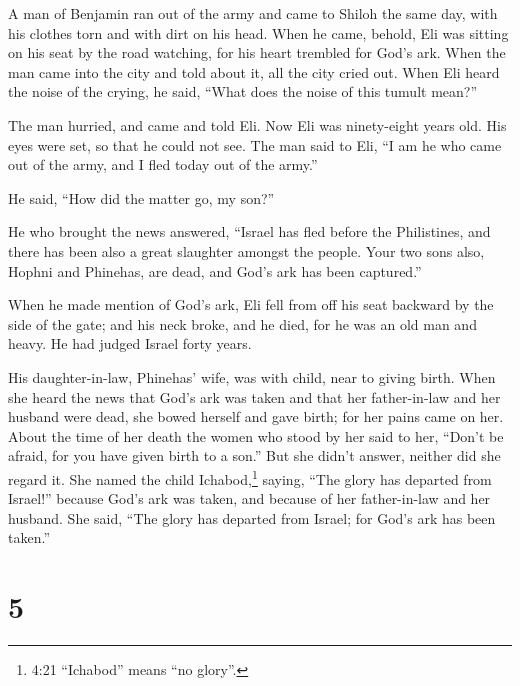  A man of Benjamin ran out of the army and came to Shiloh
the same day, with his clothes torn and with dirt on his head.
 When he came, behold, Eli was sitting on his seat by the
road watching, for his heart trembled for God's ark. When the man came
into the city and told about it, all the city cried out. 
When Eli heard the noise of the crying, he said, ``What does the noise
of this tumult mean?''

The man hurried, and came and told Eli.  Now Eli was
ninety-eight years old. His eyes were set, so that he could not see.
 The man said to Eli, ``I am he who came out of the army,
and I fled today out of the army.''

He said, ``How did the matter go, my son?''

 He who brought the news answered, ``Israel has fled before
the Philistines, and there has been also a great slaughter amongst the
people. Your two sons also, Hophni and Phinehas, are dead, and God's ark
has been captured.''

 When he made mention of God's ark, Eli fell from off his
seat backward by the side of the gate; and his neck broke, and he died,
for he was an old man and heavy. He had judged Israel forty years.

 His daughter-in-law, Phinehas' wife, was with child, near
to giving birth. When she heard the news that God's ark was taken and
that her father-in-law and her husband were dead, she bowed herself and
gave birth; for her pains came on her.  About the time of
her death the women who stood by her said to her, ``Don't be afraid, for
you have given birth to a son.'' But she didn't answer, neither did she
regard it.  She named the child Ichabod,\footnote{4:21
  ``Ichabod'' means ``no glory''.} saying, ``The glory has departed from
Israel!'' because God's ark was taken, and because of her father-in-law
and her husband.  She said, ``The glory has departed from
Israel; for God's ark has been taken.''

\hypertarget{section-4}{%
\section{5}\label{section-4}}

